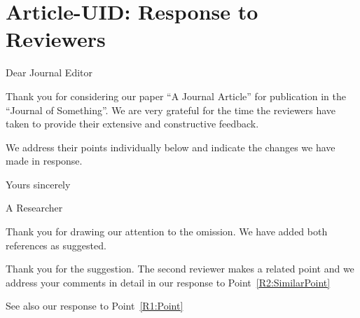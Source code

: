 \documentclass[11pt]{article}
\begin{document}
\section*{Article-UID: Response to Reviewers}



Dear Journal Editor

Thank you for considering our paper ``A Journal Article'' for publication in the ``Journal of Something''. We are very grateful for the time the reviewers have taken to provide their extensive and constructive feedback.

We address their points individually below and indicate the changes we have made in response.

Yours sincerely

\hspace{3cm}

A Researcher

\reviewersection

\begin{point}
  \lipsum[2]
  \label{R1:Point}
\end{point}

\begin{response}
 Thank you for drawing our attention to the omission. We have added both references as suggested.
\end{response}  

\shortpoint{\lipsum[20][2]}
\shortresponse{\lipsum[14][4]}

\begin{point}
\lipsum[11][2-6]
\end{point}

\begin{response}
Thank you for the suggestion. The second reviewer makes a related point and we address your comments in detail in our response to Point~\ref{R2:SimilarPoint}
\end{response}


\reviewersection

\begin{point}
  \lipsum[8][1-4]
\end{point}

\begin{response}
\lipsum[9][1-3] See also our response to Point~\ref{R1:Point}
\end{response}

\shortpoint{\lipsum[10][6]}
\shortresponse{\lipsum[25][3-4]}

\begin{point}
  \label{R2:SimilarPoint}
  \lipsum[5]
\end{point}

\begin{response}
  \lipsum[4][2-8]
\end{response}
\end{document}
